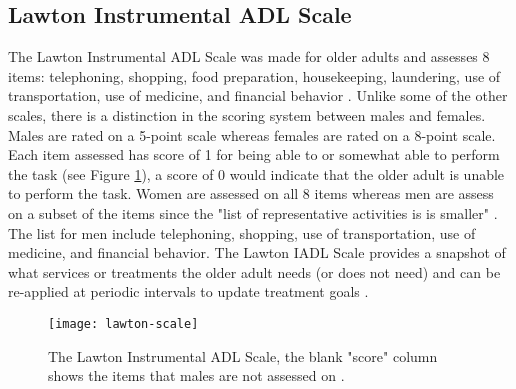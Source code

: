 \subsection{Lawton Instrumental ADL Scale}
The Lawton Instrumental ADL Scale was made for older adults and assesses 8 items: telephoning, shopping, food preparation, housekeeping, laundering, use of transportation, use of medicine, and financial behavior \cite{lawton_assessment_1969}. Unlike some of the other scales, there is a distinction in the scoring system between males and females. Males are rated on a 5-point scale whereas females are rated on a 8-point scale. Each item assessed has score of 1 for being able to or somewhat able to perform the task (see Figure \ref{fig:lawton-scale}), a score of 0 would indicate that the older adult is unable to perform the task. Women are assessed on all 8 items whereas men are assess on a subset of the items since the "list of representative activities is is smaller" \cite{lawton_assessment_1969}. The list for men include telephoning, shopping, use of transportation, use of medicine, and financial behavior. The Lawton IADL Scale provides a snapshot of what services or treatments the older adult needs (or does not need) and can be re-applied at periodic intervals to update treatment goals \cite{lawton_assessment_1969}.

\begin{figure}[ht]
    \centering
    \texttt{[image: lawton-scale]}
    \caption{The Lawton Instrumental ADL Scale, the blank "score" column shows the items that males are not assessed on \cite{lawton_assessment_1969}.}
    \label{fig:lawton-scale}
\end{figure}

\clearpage
